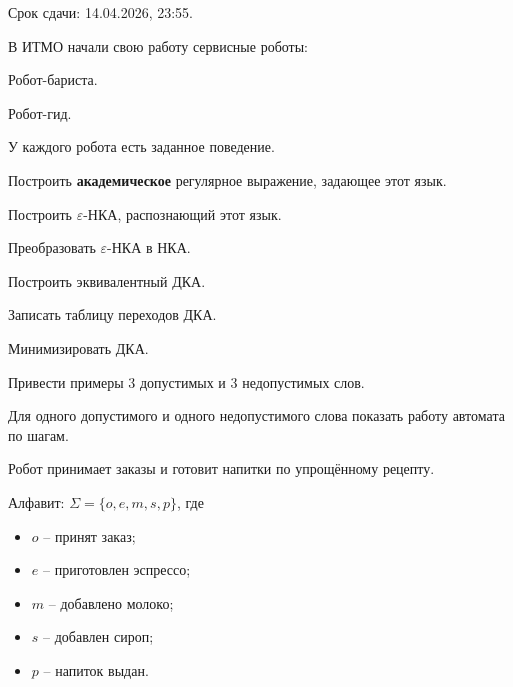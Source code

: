 \documentclass[a4paper,12pt,oneside]{article}
\begin{document}
\noindent Срок сдачи: 14.04.2026, 23:55.\hfill
{}

\medskip
В ИТМО начали свою работу сервисные роботы:
\begin{numlist}
  \item Робот-бариста.
  \item Робот-гид.
\end{numlist}
У каждого робота есть заданное поведение.

\begin{numlist}
  \item Построить \textbf{академическое} регулярное выражение, задающее этот язык.
  \item Построить $\varepsilon$-НКА, распознающий этот язык.
  \item Преобразовать $\varepsilon$-НКА в НКА.
  \item Построить эквивалентный ДКА.
  \item Записать таблицу переходов ДКА.
  \item Минимизировать ДКА.
  \item Привести примеры 3 допустимых и 3 недопустимых слов.
  \item Для одного допустимого и одного недопустимого слова показать работу автомата по шагам.
\end{numlist}

Робот принимает заказы и готовит напитки по упрощённому рецепту.

\noindent Алфавит: $\Sigma=\{o,e,m,s,p\}$, где
\begin{itemize}
  \item $o$ -- принят заказ;
  \item $e$ -- приготовлен эспрессо;
  \item $m$ -- добавлено молоко;
  \item $s$ -- добавлен сироп;
  \item $p$ -- напиток выдан.
\end{itemize}
\end{document}
